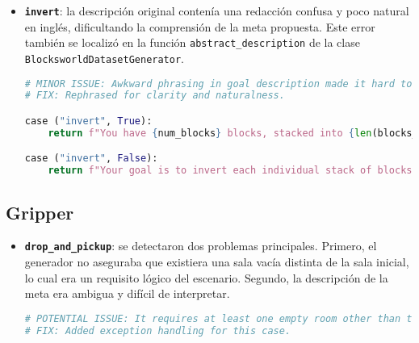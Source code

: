 \begin{anexes}
\begin{itemize}
\begin{lstlisting}
case ("equal_towers", False):
    num_blocks = self._equal_towers(blocks_list)
    return f"Your goal is to stack the blocks into {len(num_blocks)} towers of equal heights."
\end{lstlisting}

    \item \textbf{\texttt{invert}}: la descripción original contenía una redacción confusa y poco natural en inglés, dificultando la comprensión de la meta propuesta. Este error también se localizó en la función \texttt{abstract\_description} de la clase \texttt{BlocksworldDatasetGenerator}.

\begin{lstlisting}[language=Python, caption={Mejora de redacción en \texttt{invert} dentro de \texttt{BlocksworldDatasetGenerator.abstract\_description}}, label={lst:invert_fix}, basicstyle=\ttfamily\small, frame=single]
# MINOR ISSUE: Awkward phrasing in goal description made it hard to understand.
# FIX: Rephrased for clarity and naturalness.

case ("invert", True):
    return f"You have {num_blocks} blocks, stacked into {len(blocks_list)} towers of heights {', '.join(str(h) for h in blocks_list)}, and your arm is empty."

case ("invert", False):
    return f"Your goal is to invert each individual stack of blocks, such that in each tower the block that was originally on the bottom will be on the top."
\end{lstlisting}
\end{itemize}

\subsection*{Gripper}

\begin{itemize}
    \item \textbf{\texttt{drop\_and\_pickup}}: se detectaron dos problemas principales. Primero, el generador no aseguraba que existiera una sala vacía distinta de la sala inicial, lo cual era un requisito lógico del escenario. Segundo, la descripción de la meta era ambigua y difícil de interpretar.

\begin{lstlisting}[language=Python, caption={Corrección lógica en \texttt{GripperDatasetGenerator.drop\_and\_pickup}}, label={lst:gripper_drop_logic}, basicstyle=\ttfamily\small, frame=single]
# POTENTIAL ISSUE: It requires at least one empty room other than the starting one.
# FIX: Added exception handling for this case.


\end{lstlisting}
\end{itemize}
\end{anexes}
